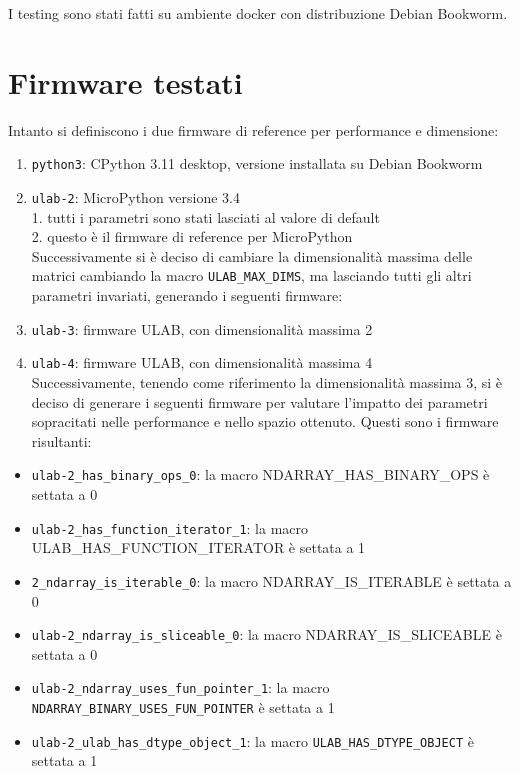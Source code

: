 \documentclass[12pt,a4paper]{report}
\begin{document}
I testing sono stati fatti su ambiente docker con distribuzione Debian
Bookworm.\\

\section{Firmware testati}

Intanto si definiscono i due firmware di reference per performance e
dimensione:

\begin{enumerate}
\item
  \texttt{python3}: CPython 3.11 desktop, versione installata su Debian
  Bookworm
\item
  \texttt{ulab-2}: MicroPython versione 3.4\\
  1. tutti i parametri sono stati lasciati al valore di default\\
  2. questo è il firmware di reference per MicroPython\\
  Successivamente si è deciso di cambiare la dimensionalità massima
  delle matrici cambiando la macro \texttt{ULAB\_MAX\_DIMS}, ma
  lasciando tutti gli altri parametri invariati, generando i seguenti
  firmware:
\item
  \texttt{ulab-3}: firmware ULAB, con dimensionalità massima 2
\item
  \texttt{ulab-4}: firmware ULAB, con dimensionalità massima 4\\
  Successivamente, tenendo come riferimento la dimensionalità massima 3,
  si è deciso di generare i seguenti firmware per valutare
  l'impatto dei parametri sopracitati nelle performance
  e nello spazio ottenuto. Questi sono i firmware risultanti:
\end{enumerate}

\begin{itemize}
\item
  \texttt{ulab-2\_has\_binary\_ops\_0}: la macro
  NDARRAY\_HAS\_BINARY\_OPS è settata a 0
\item
  \texttt{ulab-2\_has\_function\_iterator\_1}: la macro
  ULAB\_HAS\_FUNCTION\_ITERATOR è settata a 1
\item
  \texttt{2\_ndarray\_is\_iterable\_0}: la macro NDARRAY\_IS\_ITERABLE è
  settata a 0
\item
  \texttt{ulab-2\_ndarray\_is\_sliceable\_0}: la macro
  NDARRAY\_IS\_SLICEABLE è settata a 0
\item
  \texttt{ulab-2\_ndarray\_uses\_fun\_pointer\_1}: la macro
  \texttt{NDARRAY\_BINARY\_USES\_FUN\_POINTER} è settata a 1
\item
  \texttt{ulab-2\_ulab\_has\_dtype\_object\_1}: la macro
  \texttt{ULAB\_HAS\_DTYPE\_OBJECT} è settata a 1
\end{itemize}
\end{document}
